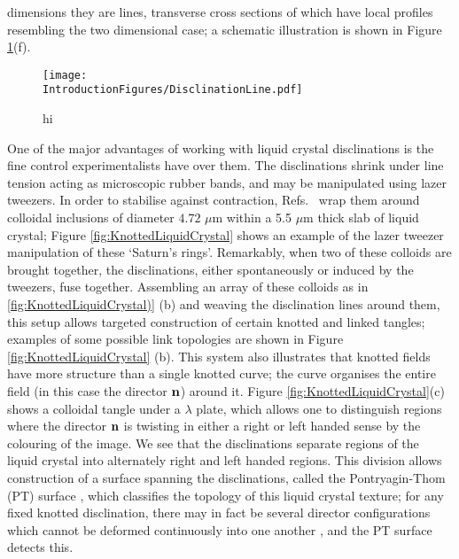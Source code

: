 dimensions they are lines, transverse cross sections of which have local profiles resembling the two dimensional case; a schematic illustration is shown in Figure \ref{fig:Disclination}(f). 
\begin{figure}[htbp]
\centering
\texttt{[image: \\IntroductionFigures/DisclinationLine.pdf]}
\caption{hi }
\label{fig:Disclination}
\end{figure}

One of the major advantages of working with liquid crystal disclinations is the fine control experimentalists have over them. The disclinations shrink under line tension \cite{Tkalec2011} acting as microscopic rubber bands, and may be manipulated using lazer tweezers. In order to stabilise against contraction, Refs.~\cite{Tkalec2011,Tasinkevych2014,Copar2015} wrap them around colloidal inclusions of diameter $4.72$ $\mu$m within a 5.5 $\mu$m thick slab of liquid crystal; Figure \ref{fig:KnottedLiquidCrystal} shows an example of the lazer tweezer manipulation of these `Saturn's rings'. Remarkably, when two of these colloids are brought together, the disclinations, either spontaneously or induced by the tweezers, fuse together. Assembling an array of these colloids as in \ref{fig:KnottedLiquidCrystal)} (b) and weaving the disclination lines around them, this setup allows targeted construction of certain knotted and linked tangles; examples of some possible link topologies are shown in Figure \ref{fig:KnottedLiquidCrystal} (b). This system also illustrates that knotted fields have more structure than a single knotted curve; the curve organises the entire field  (in this case the director $\bf n$) around it. Figure \ref{fig:KnottedLiquidCrystal}(c) shows a colloidal tangle under a $\lambda$ plate, which allows one to distinguish regions where the director $\bf n$ is twisting in either a right or left handed sense by the colouring of the image. We see that the disclinations separate regions of the liquid crystal into alternately right and left handed regions. This division allows construction of a surface spanning the disclinations, called the Pontryagin-Thom (PT) surface \cite{Chen}, which classifies the topology of this liquid crystal texture; for any fixed knotted disclination, there may in fact be several director configurations which cannot be deformed continuously into one another \cite{Machon}, and the PT surface detects this. 

